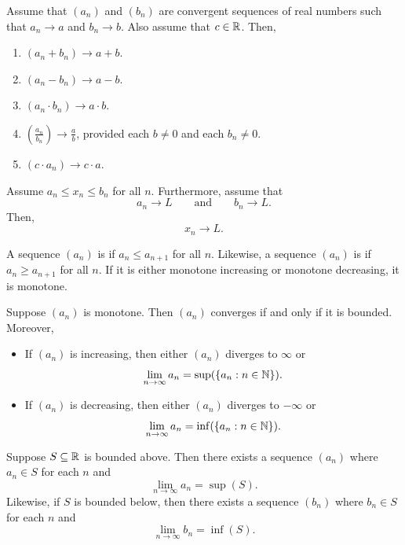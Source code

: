 \documentclass[11pt,twoside=off,numbers=noenddot]{scrbook}
\begin{document}
\begin{theorem}
    Assume that $(a_n)$ and $(b_n)$ are convergent sequences of real numbers such that $a_n \to a$ and $b_n \to b$. Also assume that $c \in \mathbb R$. Then,
    \begin{enumerate}
        \item $(a_n + b_n) \to a + b$.
        \item $(a_n - b_n) \to a - b$.
        \item $(a_n \cdot b_n) \to a \cdot b$.
        \item $(\frac{a_n}{b_n}) \to \frac{a}{b}$, provided each $b \neq 0$ and each $b_n \neq 0$.
        \item $(c \cdot a_n) \to c \cdot a$.
    \end{enumerate}
\end{theorem}

\begin{theorem}
    Assume $a_n \leq x_n \leq b_n$ for all $n$. Furthermore, assume that
    \[ a_n \to L \qquad \text{and} \qquad b_n \to L. \]
    Then,
    \[ x_n \to L. \]
\end{theorem}

\begin{definition}
    A sequence $(a_n)$ is  if $a_n \leq a_{n + 1}$ for all $n$. Likewise, a sequence $(a_n)$ is  if $a_n \geq a_{n + 1}$ for all $n$. If it is either monotone increasing or monotone decreasing, it is monotone.
\end{definition}

\begin{theorem}
    Suppose $(a_n)$ is monotone. Then $(a_n)$ converges if and only if it is bounded. Moreover,
    \begin{itemize}
        \item If $(a_n)$ is increasing, then either $(a_n)$ diverges to $\infty$ or
        \[ \lim_{n \to \infty} a_n = \sup(\{ a_n : n \in \mathbb N \}). \]
        \item If $(a_n)$ is decreasing, then either $(a_n)$ diverges to $-\infty$ or
        \[ \lim_{n \to \infty} a_n = \inf(\{ a_n : n \in \mathbb N \}). \]
    \end{itemize}
\end{theorem}

\begin{proposition}
    Suppose $S \subseteq \mathbb R$ is bounded above. Then there exists a sequence $(a_n)$ where $a_n \in S$ for each $n$ and
    \[ \lim_{n \to \infty} a_n = \sup(S). \]
    Likewise, if $S$ is bounded below, then there exists a sequence $(b_n)$ where $b_n \in S$ for each $n$ and
    \[ \lim_{n \to \infty} b_n = \inf(S). \]
\end{proposition}
\end{document}
